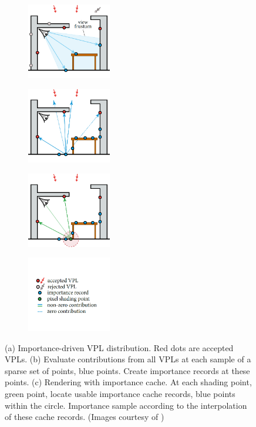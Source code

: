 \documentclass[]{book}
\begin{document}
\begin{figure}[!ht]
	\begin{subfigure}{0.25\textwidth}
		\centering
		\includegraphics[height=1.3in]{img/IMP_2_1.png}
		\caption{}
		\label{fig:IMP:buildCacheRender:a}
	\end{subfigure}%
	\begin{subfigure}{0.25\textwidth}
		\centering
		\includegraphics[height=1.3in]{img/IMP_2_2.png}
		\caption{}
	\end{subfigure}%
	\begin{subfigure}{0.25\textwidth}
		\centering
		\includegraphics[height=1.3in]{img/IMP_2_3.png}
		\caption{}
	\end{subfigure}%
	\begin{subfigure}{0.25\textwidth}
		\centering
		\includegraphics[height=1.3in]{img/IMP_2_4.png}
	\end{subfigure}
	\caption[Building and Using Importance Cache]{(a) Importance-driven VPL distribution. Red dots are accepted VPLs. (b) Evaluate contributions from all VPLs at each sample of a sparse set of points, blue points. Create importance records at these points. (c) Rendering with importance cache. At each shading point, green point, locate usable importance cache records, blue points within the circle. Importance sample according to the interpolation of these cache records. (Images courtesy of \citeauthor{georgiev2012importance})}
	\label{fig:IMP:buildCacheRender}
\end{figure}
\end{document}
